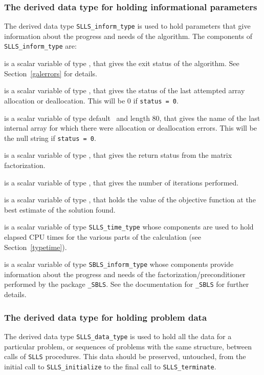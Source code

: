 \documentclass{galahad}
\newcommand{\packagename}{SLLS}
\begin{document}
\subsubsection{The derived data type for holding informational
 parameters}\label{typeinform}
The derived data type
{\tt \packagename\_inform\_type}
is used to hold parameters that give information about the progress and needs
of the algorithm. The components of
{\tt \packagename\_inform\_type}
are:

\begin{description}

 is a scalar variable of type \integer, that gives the
exit status of the algorithm.
See Section~\ref{galerrors}
for details.

 is a scalar variable of type \integer, that gives
the status of the last attempted array allocation or deallocation.
This will be 0 if {\tt status = 0}.

 is a scalar variable of type default \character\
and length 80, that  gives the name of the last internal array
for which there were allocation or deallocation errors.
This will be the null string if {\tt status = 0}.

 is a scalar variable of type \integer, that
gives the return status from the matrix factorization.

 is a scalar variable of type \integer, that
gives the number of iterations performed.

 is a scalar variable of type \realdp, that holds the
value of the objective function at the best estimate of the solution found.

 is a scalar variable of type {\tt \packagename\_time\_type}
whose components are used to hold elapsed CPU times for the various parts
of the calculation (see Section~\ref{typetime}).

 is a scalar variable of type
{\tt SBLS\_inform\_type} %
whose components provide information about the progress and needs
of the factorization/preconditioner
performed by the package
{\tt \libraryname\_SBLS}.
See the documentation for {\tt \libraryname\_SBLS} for further details.

\end{description}


\subsubsection{The derived data type for holding problem data}\label{typedata}
The derived data type
{\tt \packagename\_data\_type}
is used to hold all the data for a particular problem,
or sequences of problems with the same structure, between calls of
{\tt \packagename} procedures.
This data should be preserved, untouched, from the initial call to
{\tt \packagename\_initialize}
to the final call to
{\tt \packagename\_terminate}.
\end{document}
